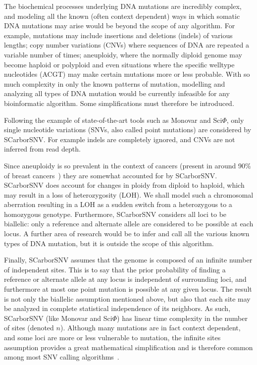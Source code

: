 \documentclass[../../main.tex]{subfiles}
\begin{document}
The biochemical processes underlying DNA mutations are incredibly complex, and modeling all the known (often context dependent) ways in which somatic DNA mutations may arise would be beyond the scope of any algorithm.
For example, mutations may include insertions and deletions (indels) of various lengths; copy number variations (CNVs) where sequences of DNA are repeated a variable number of times; aneuploidy, where the normally diploid genome may become haploid or polyploid and even situations where the specific welltype nucleotides (ACGT) may make certain mutations more or less probable\cite{monovar, 21breasts, 21breasts2, metastatic, gao2016punctuated}.
With so much complexity in only the known patterns of mutation, modelling and analyzing all types of DNA mutation would be currently infeasible for any bioinformatic algorithm.
Some simplifications must therefore be introduced.

Following the example of state-of-the-art tools such as Monovar and Sci$\Phi$, only single nucleotide variations (SNVs, also called point mutations) are considered by SCarborSNV.
For example indels are completely ignored, and CNVs are not inferred from read depth.

Since aneuploidy is so prevalent in the context of cancers (present in around 90\% of breast cancers~\cite{gao2016punctuated}) they are somewhat accounted for by SCarborSNV.
SCarborSNV does account for changes in ploidy from diploid to haploid, which may result in a loss of heterozygosity (LOH).
We shall model such a chromosomal aberration resulting in a LOH as a sudden switch from a heterozygous to a homozygous genotype.
Furthermore, SCarborSNV considers all loci to be biallelic: only a reference and alternate allele are considered to be possible at each locus.
A further area of research would be to infer and call all the various known types of DNA mutation, but it is outside the scope of this algorithm.

Finally, SCarborSNV assumes that the genome is composed of an infinite number of independent sites.
This is to say that the prior probability of finding a reference or alternate allele at any locus is independent of surrounding loci, and furthermore at most one point mutation is possible at any given locus.
The result is not only the biallelic assumption mentioned above, but also that each site may be analyzed in complete statistical independence of its neighbors.
As such, SCarborSNV (like Monovar and Sci$\Phi$) has linear time complexity in the number of sites (denoted $n$).
Although many mutations are in fact context dependent, and some loci are more or less vulnerable to mutation, the infinite sites assumption provides a great mathematical simplification and is therefore common among most SNV calling algorithms~\cite{greenman2007patterns, 21breasts2, alexandrov2013signatures}.
\end{document}
